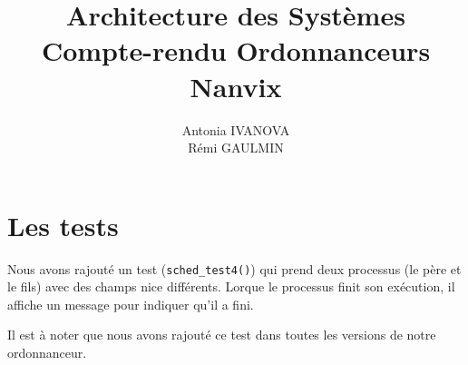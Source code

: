 \documentclass[a4paper,11pt,french]{article}
\title{Architecture des Systèmes\\Compte-rendu Ordonnanceurs Nanvix}
\author{Antonia IVANOVA\\Rémi GAULMIN}
\begin{document}
\maketitle

\tableofcontents







\section{Les tests}

Nous avons rajouté un test (\texttt{sched\_test4()}) qui prend deux processus (le père et le fils) avec des champs nice différents. Lorque le processus finit son exécution, il affiche un message pour indiquer qu'il a fini.

Il est à noter que nous avons rajouté ce test dans toutes les versions de notre ordonnanceur.
\end{document}
